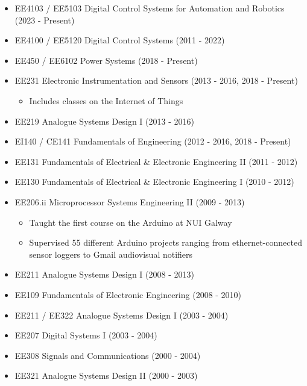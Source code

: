 \documentclass[10pt,a4paper]{res} %
\begin{document}
\begin{resume}
\begin{itemize} \itemsep -2pt
\item EE4103 / EE5103 Digital Control Systems for Automation and Robotics (2023 - Present)
\item EE4100 / EE5120 Digital Control Systems (2011 - 2022)
\item EE450 / EE6102 Power Systems (2018 - Present)
\item EE231 Electronic Instrumentation and Sensors (2013 - 2016, 2018 - Present)
\begin{itemize} \itemsep -2pt
\item Includes classes on the Internet of Things
\end{itemize}
\item EE219 Analogue Systems Design I (2013 - 2016)
\item EI140 / CE141 Fundamentals of Engineering (2012 - 2016, 2018 - Present)
\item EE131 Fundamentals of Electrical \& Electronic Engineering II (2011 - 2012)
\item EE130 Fundamentals of Electrical \& Electronic Engineering I (2010 - 2012)
\item EE206.ii Microprocessor Systems Engineering II (2009 - 2013)
\begin{itemize} \itemsep -2pt
\item Taught the first course on the Arduino at NUI Galway
\item Supervised 55 different Arduino projects ranging from ethernet-connected sensor loggers to Gmail audiovisual notifiers
\end{itemize}
\item EE211 Analogue Systems Design I (2008 - 2013)
\item EE109 Fundamentals of Electronic Engineering (2008 - 2010)
\item EE211 / EE322 Analogue Systems Design I (2003 - 2004)
\item EE207 Digital Systems I (2003 - 2004)
\item EE308 Signals and Communications (2000 - 2004)
\item EE321 Analogue Systems Design II (2000 - 2003)
\end{itemize}


\vspace{0.2in} %



\end{resume}
\end{document}
